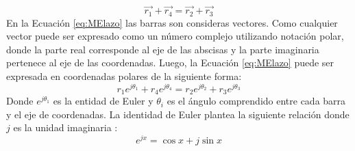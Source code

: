 \begin{equation}\label{eq:MElazo}
\vec{r_1}+\vec{r_4}=\vec{r_2}+\vec{r_3}
\end{equation}
 En la Ecuación \ref{eq:MElazo} las barras son consideras vectores. Como cualquier vector puede ser expresado como un número complejo utilizando notación polar, donde la parte real corresponde al eje de las abscisas y la parte imaginaria pertenece al eje de las coordenadas. Luego, la Ecuación \ref{eq:MElazo} puede ser expresada en coordenadas polares de la siguiente forma:
\begin{equation}\label{eq:MElazoPolar}
r_1e^{j\theta_1}+r_4e^{j\theta_4}=r_2e^{j\theta_2}+r_3e^{j\theta_3}
\end{equation}
Donde $e^{j\theta_1}$ es la entidad de Euler y $\theta_i$ es el ángulo comprendido entre cada barra y el eje de coordenadas. La identidad de Euler plantea la siguiente relación donde $j$ es la unidad imaginaria \cite{weisstein_euler_nodate}:
\begin{equation}\label{eq:Euler}
 e^{jx}=\cos{x}+j\sin{x} 
\end{equation}


